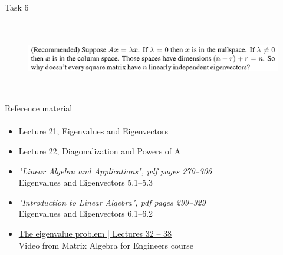 \documentclass[aspectratio=169]{beamer}
\newcommand{\fbckg}[1]{\usebackgroundtemplate{\texttt{[image: \#1]}}}%
\begin{document}
\begin{frame}[t]{Task 6}
    \framesubtitle{}
    \vspace{-0.5cm}
    \begin{figure}[H]
        \centering\includegraphics[height=3cm,width=1\textwidth,keepaspectratio]{6.png}
        \label{fig:6.png}
    \end{figure}
\end{frame}

\begin{frame}[t]{Reference material}
    \framesubtitle{}
    \Large
    \begin{itemize}
        \item \href{https://www.youtube.com/watch?v=lXNXrLcoerU&list=PL49CF3715CB9EF31D&index=21}{Lecture 21, Eigenvalues and Eigenvectors}
        \item \href{https://www.youtube.com/watch?v=13r9QY6cmjc&list=PL49CF3715CB9EF31D&index=22}{Lecture 22, Diagonalization and Powers of A}
        \item \textit{"Linear Algebra and Applications", pdf pages 270--306 }\\ Eigenvalues and Eigenvectors 5.1--5.3
        \item \textit{"Introduction to Linear Algebra", pdf pages 299--329 }\\ Eigenvalues and Eigenvectors 6.1--6.2
        \item  \href{https://www.youtube.com/watch?v=29keVZGvqME&list=PLkZjai-2Jcxlg-Z1roB0pUwFU-P58tvOx&index=34}{The eigenvalue problem | Lectures 32 -- 38}\\ Video from Matrix Algebra for Engineers course
    \end{itemize}
\end{frame}

\fbckg{fibeamer/figs/last_page.png}
\frame[plain]{}
\end{document}
